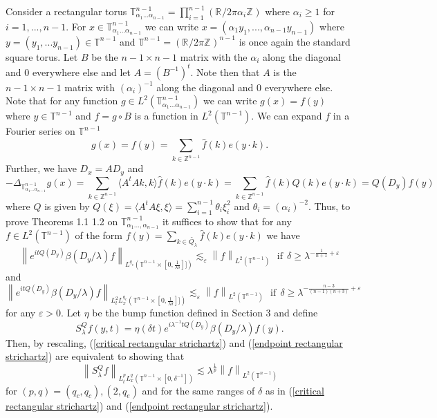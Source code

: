 \documentclass[11pt]{amsart}
\numberwithin{equation}{section}
\newcommand{\Zn}{\mathbb{Z}^{n-1}}
\newcommand{\Tn}{\mathbb{T}^{n-1}}
\newcommand{\la}{\lambda}
\newcommand\norm[1]{\left\lVert#1\right\rVert}
\newcommand{\lpnorm}[3]{\norm{#1}_{L^{#2}(#3)}}
\newcommand{\mixlpnorm}[4]{\norm{#1}_{L^{#2}_{t} L^{#3}_{x}(#4)}}
\newcommand{\R}[1][]{\mathbb{R}^#1}
\newcommand{\Z}[1][]{\mathbb{Z}^#1}
\newcommand{\laplac}[1]{\Delta_{#1}}
\newcommand{\Sl}{S_{\la}}
\begin{document}
Consider a rectangular torus $ \Tn_{\alpha_1...\alpha_{n-1}} = \prod_{i = 1}^{n-1} \left(\R{}/2\pi\alpha_i \Z{}\right)$ where $\alpha_i \geq 1$ for $i = 1,..., n-1$. For $x \in \Tn_{\alpha_1...\alpha_{n-1}}$ we can write $x = (\alpha_1y_1,...,\alpha_{n-1}y_{n-1})$ where $y = (y_1,...y_{n-1}) \in \Tn$ and $\Tn = \left( \R{}/2\pi\Z{}\right)^{n-1}$ is once again the standard square torus. Let $B$ be the $n-1 \times n-1$ matrix with the $\alpha_i$ along the diagonal and $0$ everywhere else and let $A = \left(B^{-1}\right)^{t}$. Note then that $A$ is the $n-1 \times n-1$ matrix with $(\alpha_i)^{-1}$ along the diagonal and 0 everywhere else. Note that for any function $g \in L^2(\Tn_{\alpha_1...\alpha_{n-1}})$ we can write $g(x) = f(y)$ where $y \in \Tn$ and $f = g \circ B$ is a function in $L^2(\Tn)$. We can expand $f$ in a Fourier series on $\Tn$
\begin{equation*}
    g(x) = f(y) = \sum_{k\in \Zn}\widehat{f}(k)e(y \cdot k).
\end{equation*}
Further, we have $D_x = A D_y$ and
\begin{equation}
    -\laplac{\Tn_{\alpha_1...\alpha_{n-1}}}g(x) = \sum_{k \in \Zn}\langle A^tAk,k\rangle\widehat{f}(k)e(y \cdot k) = \sum_{k \in \Zn}\widehat{f}(k)Q(k)e(y \cdot k) = Q(D_y)f(y)
\end{equation}
where $Q$ is given by $Q(\xi) = \langle A^tA\xi, \xi\rangle = \sum_{i = 1}^{n-1}\theta_i\xi_i^2$ and $\theta_i = (\alpha_i)^{-2}$. Thus, to prove Theorems 1.1 1.2 on $\Tn_{\alpha_1...,\alpha_{n-1}}$ it suffices to show that for any $f \in L^2(\Tn)$ of the form $f(y) = \sum_{k \in \tilde{Q_{\la}}}\widehat{f}(k)e(y\cdot k)$ we have
\begin{equation} \label{critical rectangular strichartz}
    \lpnorm{e^{itQ(D_y)}\beta(D_y/\la)f}{q_c}{\Tn \times [0,\frac{1}{\la \delta}]]} \lesssim_{\varepsilon} \lpnorm{f}{2}{\Tn} \ \ \ \text{if} \ \ \delta \geq \la^{-\frac{1}{n+1} + \varepsilon}
\end{equation}
and
\begin{equation}\label{endpoint rectangular strichartz}
    \mixlpnorm{e^{itQ(D_y)}\beta(D_y/\la)f}{2}{q_e}{\Tn \times [0,\frac{1}{\la \delta}]]} \lesssim_{\varepsilon} \lpnorm{f}{2}{\Tn} \ \ \ \text{if} \ \ \delta \geq \la^{-\frac{n-3}{(n-1)(n+3)} + \varepsilon}
\end{equation}
for any $\varepsilon > 0$. Let $\eta$ be the bump function defined in Section 3 and define 
\begin{equation} \label{rectangular time-dilated schrodinger propagator}
    \Sl^{Q}f(y,t) = \eta(\delta t)e^{i\la^{-1}tQ(D_y)}\beta(D_y/\la)f(y).
\end{equation}
Then, by rescaling, (\ref{critical rectangular strichartz}) and (\ref{endpoint rectangular strichartz}) are equivalent to showing that 
\begin{equation} 
    \mixlpnorm{\Sl^{Q} f}{p}{q}{\Tn \times [0,\delta^{-1}]} \lesssim \la^{\frac{1}{p}}\lpnorm{f}{2}{\Tn}
\end{equation}
for $(p,q) = (q_c,q_c), (2,q_e)$ and for the same ranges of $\delta$ as in (\ref{critical rectangular strichartz}) and (\ref{endpoint rectangular strichartz}).
\end{document}
